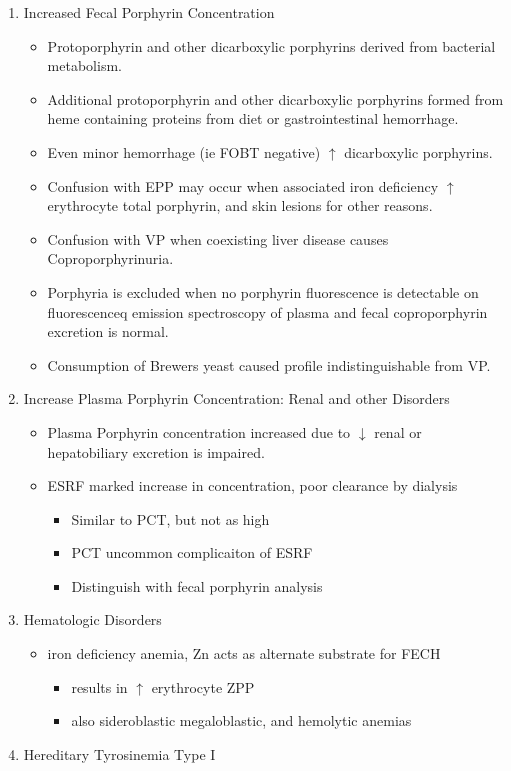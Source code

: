 \documentclass{scrartcl}
\begin{document}
\begin{enumerate}
\item Increased Fecal Porphyrin Concentration
\label{sec:org9ff7af9}
\begin{itemize}
\item Protoporphyrin and other dicarboxylic porphyrins derived from
bacterial metabolism.
\item Additional protoporphyrin and other dicarboxylic porphyrins formed
from heme containing proteins from diet or gastrointestinal
hemorrhage.
\item Even minor hemorrhage (ie FOBT negative) \(\uparrow\) dicarboxylic porphyrins.
\item Confusion with EPP may occur when associated iron deficiency
\(\uparrow\) erythrocyte total porphyrin, and skin lesions for other reasons.
\item Confusion with VP when coexisting liver disease causes
Coproporphyrinuria.
\item Porphyria is excluded when no porphyrin fluorescence is detectable
on fluorescenceq emission spectroscopy of plasma and fecal
coproporphyrin excretion is normal.
\item Consumption of Brewers yeast caused profile indistinguishable from
VP.
\end{itemize}

\item Increase Plasma Porphyrin Concentration: Renal and other Disorders
\label{sec:org33da045}
\begin{itemize}
\item Plasma Porphyrin concentration increased due to \(\downarrow\) renal or
hepatobiliary excretion is impaired.
\item ESRF marked increase in concentration, poor clearance by dialysis
\begin{itemize}
\item Similar to PCT, but not as high
\item PCT uncommon complicaiton of ESRF
\item Distinguish with fecal porphyrin analysis
\end{itemize}
\end{itemize}
\item Hematologic Disorders
\label{sec:org037c171}
\begin{itemize}
\item iron deficiency anemia, Zn acts as alternate substrate for FECH
\begin{itemize}
\item results in \(\uparrow\) erythrocyte ZPP
\item also sideroblastic megaloblastic, and hemolytic anemias
\end{itemize}
\end{itemize}
\item Hereditary Tyrosinemia Type I
\label{sec:orgfba4aa4}
\end{enumerate}
\end{document}
